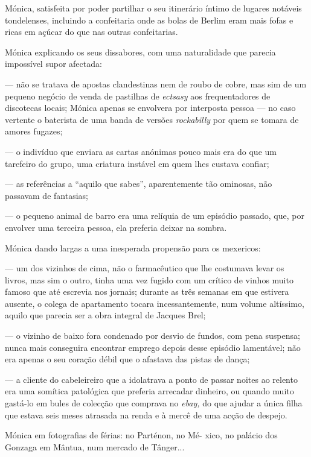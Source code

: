 Mónica, satisfeita por poder partilhar o seu itinerário íntimo de
lugares notáveis tondelenses, incluindo a confeitaria onde as bolas de
Berlim eram mais fofas e ricas em açúcar do que nas outras confeitarias.

Mónica explicando os seus dissabores, com uma naturalidade que parecia
impossível supor afectada:

--- não se tratava de apostas clandestinas nem de roubo de cobre, mas sim
  de um pequeno negócio de venda de pastilhas de \emph{ectsasy }aos
  frequentadores de discotecas locais; Mónica apenas se envolvera por
  interposta pessoa --- no caso vertente o baterista de uma banda de
  versões \emph{rockabilly }por quem se tomara de amores fugazes;

--- o indivíduo que enviara as cartas anónimas pouco mais era do que um
  tarefeiro do grupo, uma criatura instável em quem lhes custava
  confiar;

--- as referências a ``aquilo que sabes'', aparentemente tão ominosas, não
  passavam de fantasias;

--- o pequeno animal de barro era uma relíquia de um episódio passado,
  que, por envolver uma terceira pessoa, ela preferia deixar na sombra.


Mónica dando largas a uma inesperada propensão para os mexericos:

--- um dos vizinhos de cima, não o farmacêutico que lhe costumava levar os
  livros, mas sim o outro, tinha uma vez fugido com um crítico de
  vinhos muito famoso que até escrevia nos jornais; durante as três
  semanas em que estivera ausente, o colega de apartamento tocara
  incessantemente, num volume altíssimo, aquilo que parecia ser a obra
  integral de Jacques Brel;


--- o vizinho de baixo fora condenado por desvio de fundos, com pena
  suspensa; nunca mais conseguira encontrar emprego depois desse
  episódio lamentável; não era apenas o seu coração débil que o afastava
  das pistas de dança;

--- a cliente do cabeleireiro que a idolatrava a ponto de passar noites ao
  relento era uma somítica patológica que preferia arrecadar dinheiro,
  ou quando muito gastá-lo em bules de colecção que comprava no
  \emph{ebay, }do que ajudar a única filha que estava seis meses
  atrasada na renda e à mercê de uma acção de despejo.


Mónica em fotografias de férias: no Parténon, no Mé- xico, no palácio
dos Gonzaga em Mântua, num mercado de Tânger...

